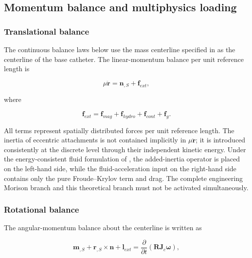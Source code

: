 \subsection{Momentum balance and multiphysics loading}\label{sec:rod-1-4}

\subsubsection{Translational balance}\label{sec:rod-1-4-1}

The continuous balance laws below use the mass centerline specified in  as the centerline of the base catheter. The linear-momentum balance per unit reference length is

\begin{equation}
\label{eq:rod-1-38}
\mu\ddot{\mathbf{r}} = \mathbf{n}_{,S} + \mathbf{f}_{ext},
\end{equation}

where

\begin{equation}
\label{eq:rod-1-39}
\mathbf{f}_{ext} = \mathbf{f}_{mag} + \mathbf{f}_{hydro} + \mathbf{f}_{cont} + \mathbf{f}_{g}.
\end{equation}

All terms represent spatially distributed forces per unit reference length. The inertia of eccentric attachments is not contained implicitly in \(\mu\ddot{\mathbf{r}}\); it is introduced consistently at the discrete level through their independent kinetic energy. Under the energy-consistent fluid formulation of , the added-inertia operator is placed on the left-hand side, while the fluid-acceleration input on the right-hand side contains only the pure Froude--Krylov term and drag. The complete engineering Morison branch and this theoretical branch must not be activated simultaneously.

\subsubsection{Rotational balance}\label{sec:rod-1-4-2}

The angular-momentum balance about the centerline is written as

\begin{equation}
\label{eq:rod-1-40}
\mathbf{m}_{,S} + \mathbf{r}_{,S} \times \mathbf{n} + \mathbf{l}_{ext} = \frac{\partial}{\partial t}\left( \mathbf{R}\mathbf{J}_{c}\bm{\omega} \right),
\end{equation}

